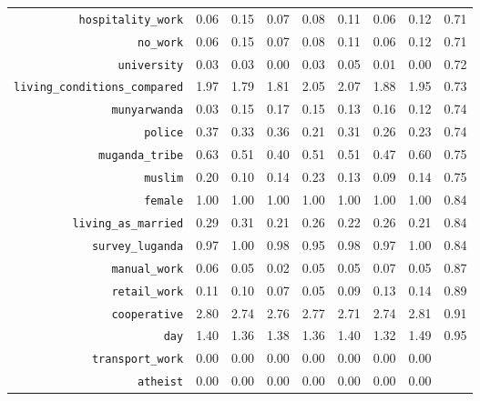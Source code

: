 \begin{longtable}{rrrrrrrrr}
  {\texttt{hospitality\_work}} & 0.06 & 0.15 & 0.07 & 0.08 & 0.11 & 0.06 & 0.12 & 0.71 \\ 
  {\texttt{no\_work}} & 0.06 & 0.15 & 0.07 & 0.08 & 0.11 & 0.06 & 0.12 & 0.71 \\ 
  {\texttt{university}} & 0.03 & 0.03 & 0.00 & 0.03 & 0.05 & 0.01 & 0.00 & 0.72 \\ 
  {\texttt{living\_conditions\_compared}} & 1.97 & 1.79 & 1.81 & 2.05 & 2.07 & 1.88 & 1.95 & 0.73 \\ 
  {\texttt{munyarwanda}} & 0.03 & 0.15 & 0.17 & 0.15 & 0.13 & 0.16 & 0.12 & 0.74 \\ 
  {\texttt{police}} & 0.37 & 0.33 & 0.36 & 0.21 & 0.31 & 0.26 & 0.23 & 0.74 \\ 
  {\texttt{muganda\_tribe}} & 0.63 & 0.51 & 0.40 & 0.51 & 0.51 & 0.47 & 0.60 & 0.75 \\ 
  {\texttt{muslim}} & 0.20 & 0.10 & 0.14 & 0.23 & 0.13 & 0.09 & 0.14 & 0.75 \\ 
  {\texttt{female}} & 1.00 & 1.00 & 1.00 & 1.00 & 1.00 & 1.00 & 1.00 & 0.84 \\ 
  {\texttt{living\_as\_married}} & 0.29 & 0.31 & 0.21 & 0.26 & 0.22 & 0.26 & 0.21 & 0.84 \\ 
  {\texttt{survey\_luganda}} & 0.97 & 1.00 & 0.98 & 0.95 & 0.98 & 0.97 & 1.00 & 0.84 \\ 
  {\texttt{manual\_work}} & 0.06 & 0.05 & 0.02 & 0.05 & 0.05 & 0.07 & 0.05 & 0.87 \\ 
  {\texttt{retail\_work}} & 0.11 & 0.10 & 0.07 & 0.05 & 0.09 & 0.13 & 0.14 & 0.89 \\ 
  {\texttt{cooperative}} & 2.80 & 2.74 & 2.76 & 2.77 & 2.71 & 2.74 & 2.81 & 0.91 \\ 
  {\texttt{day}} & 1.40 & 1.36 & 1.38 & 1.36 & 1.40 & 1.32 & 1.49 & 0.95 \\ 
  {\texttt{transport\_work}} & 0.00 & 0.00 & 0.00 & 0.00 & 0.00 & 0.00 & 0.00 &  \\ 
  {\texttt{atheist}} & 0.00 & 0.00 & 0.00 & 0.00 & 0.00 & 0.00 & 0.00 &  \\ 
   \hline
\hline
\end{longtable}
